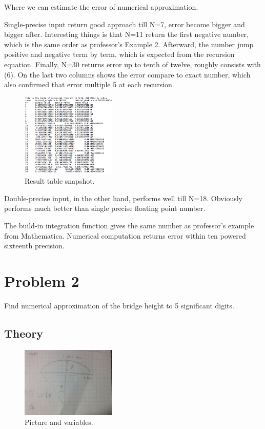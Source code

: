 \documentclass[12pt]{article}
\begin{document}
Where we can estimate the error of numerical approximation. 

Single-precise input return good approach till N=7, error become bigger and bigger after. Interesting things is that N=11 return the first negative number, which is the same order as professor's Example 2. Afterward, the number jump positive and negative term by term, which is expected from the recursion equation. Finally, N=30 returns error up to tenth of twelve, roughly consists with (6). On the last two columns shows the error compare to exact number, which also confirmed that error multiple 5 at each recursion.

\begin{figure}[h]
\begin{center}
\includegraphics[width=0.4\textwidth]{result.png}
\caption{Result table snapshot.}
\label{fig1}
\end{center}
\end{figure}

Double-precise input, in the other hand, performs well till N=18. Obviously performs much better than single precise floating point number.

The build-in integration function gives the same number as professor's example from Mathematica. Numerical computation returns error within ten powered sixteenth precision. 


\section{Problem 2}

Find numerical approximation of the bridge height to 5 significant digits.

\subsection{Theory}
\begin{figure}[h]
	\begin{center}
		\includegraphics[width=0.4\textwidth]{problem2}
		\caption{Picture and variables.}
		\label{fig2}
	\end{center}
\end{figure}
\end{document}
